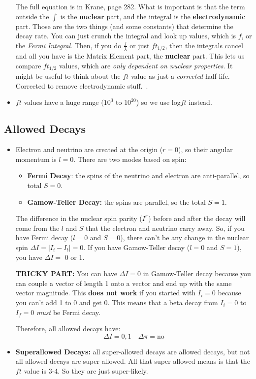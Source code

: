\documentclass[letter]{article}
\begin{document}
\begin{itemize}
\begin{equation*}
  \end{equation*}
The full equation is in Krane, page 282. What is important is that the
term outside the $\int$ is the \textbf{nuclear} part, and the integral
is the \textbf{electrodynamic} part. Those are the two things (and
some constants) that determine the decay rate. You can just crunch the
integral and look up values, which is $f$, or the \textit{Fermi
  Integral}. Then, if you do $\frac{f}{\lambda}$ or just $ft_{1/2}$,
then the integrals cancel and all you have is the Matrix Element part,
the \textbf{nuclear} part. This lets us compare $ft_{1/2}$ values,
which are \textit{only dependent on nuclear
  properties}. It might be useful to think about the $ft$ value as just a
\textit{corrected} half-life. Corrected to remove electrodynamic stuff.~\cite[pp. 282-283, Lecs. 19-21]{krane,lecture}.
\item $ft$ values have a huge range ($10^3$ to $10^{20}$) so we use
  log$ft$ instead.
\end{itemize}
\subsection{Allowed Decays}

\begin{itemize}
\item Electron and neutrino are created at the origin ($r=0$), so
  their angular momentum is $l=0$. There are two modes based on spin:
  \begin{itemize}
  \item \textbf{Fermi Decay}: the spins of the neutrino and electron
    are anti-parallel, so total $S=0$.
  \item \textbf{Gamow-Teller Decay:} the spins are parallel, so the
    total $S=1$.
  \end{itemize}
The difference in the nuclear spin parity ($I^\pi$) before and after
the decay will come from the
$l$ and $S$ that the electron and neutrino carry away. So, if you have
Fermi decay ($l=0$ and $S=0$), there can't be any change in the
nuclear spin $\Delta{}I = |I_i-I_t|=0$. If you have Gamow-Teller decay
($l=0$ and $S=1$), you have $\Delta{}I =$ 0 or 1. 
\begin{framed}
  \textbf{TRICKY PART:} You can have $\Delta{}I = 0$ in Gamow-Teller decay because you can
  couple a vector of length 1 onto a vector and end up with the same
  vector magnitude. This \textbf{does not work} if you started with
  $I_i=0$ because you can't add 1 to 0 and get 0. This means that a
  beta decay from $I_i=0$ to $I_f=0$ \textit{must} be Fermi decay.
\end{framed}
Therefore, all allowed decays have:
\begin{equation*}
  \Delta{}I = 0,1 \quad \Delta{}\pi = \text{no}
\end{equation*}
\cite[pp. 289, Lec. 19-21]{krane,lecture}
\item \textbf{Superallowed Decays:} all super-allowed decays are
  allowed decays, but not all allowed decays are super-allowed. All
  that super-allowed means is that the $ft$ value is 3-4. So they are
  just super-likely.
\end{itemize}
\end{document}
